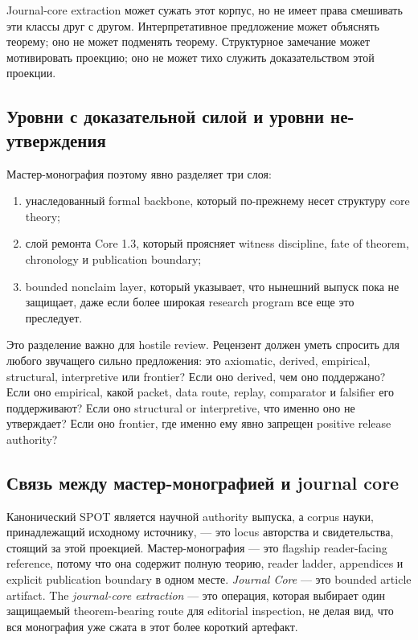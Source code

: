 Journal-core extraction может сужать этот корпус, но не имеет права
смешивать эти классы друг с другом.
Интерпретативное предложение может объяснять теорему; оно не может
подменять теорему.
Структурное замечание может мотивировать проекцию; оно не может
тихо служить доказательством этой проекции.

\subsection{Уровни с доказательной силой и уровни не-утверждения}

Мастер-монография поэтому явно разделяет три слоя:

\begin{enumerate}
\item унаследованный formal backbone, который по-прежнему несет структуру
      core theory;
\item слой ремонта Core 1.3, который проясняет witness discipline, fate of
      theorem, chronology и publication boundary;
\item bounded nonclaim layer, который указывает, что нынешний выпуск пока
      не защищает, даже если более широкая research program все еще это
      преследует.
\end{enumerate}

Это разделение важно для hostile review.
Рецензент должен уметь спросить для любого звучащего сильно предложения:
это axiomatic, derived, empirical, structural, interpretive или frontier?
Если оно derived, чем оно поддержано?
Если оно empirical, какой packet, data route, replay, comparator и
falsifier его поддерживают?
Если оно structural or interpretive, что именно оно не утверждает?
Если оно frontier, где именно ему явно запрещен positive release authority?

\subsection{Связь между мастер-монографией и journal core}

Канонический SPOT является научной authority выпуска, а corpus науки,
принадлежащий исходному источнику, — это locus авторства и свидетельства,
стоящий за этой проекцией. Мастер-монография — это flagship reader-facing
reference, потому что она содержит полную теорию, reader ladder, appendices
и explicit publication boundary в одном месте.
\emph{Journal Core} — это bounded article artifact. The
\emph{journal-core extraction} — это операция, которая выбирает один
защищаемый theorem-bearing route для editorial inspection, не делая вид, что
вся монография уже сжата в этот более короткий артефакт.

